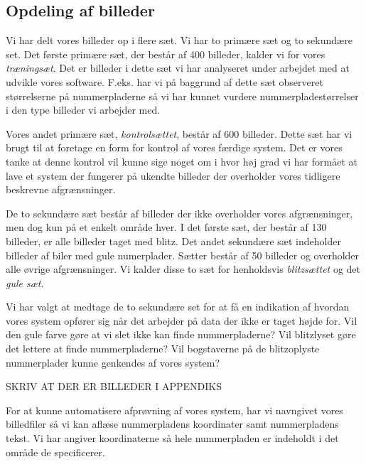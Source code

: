 \subsection{Opdeling af billeder}
Vi har delt vores billeder op i flere sæt. Vi har to primære sæt og to sekundære set. Det første primære sæt, der består af 400 billeder, kalder vi for vores \textit{træningsæt}. Det er billeder i dette sæt vi har analyseret under arbejdet med at udvikle vores software. F.eks. har vi på baggrund af dette sæt observeret størrelserne på nummerpladerne så vi har kunnet vurdere nummerpladestørrelser i den type billeder vi arbejder med.

Vores andet primære sæt, \textit{kontrolsættet}, består af 600 billeder. Dette sæt har vi brugt til at foretage en form for kontrol af vores færdige system. Det er vores tanke at denne kontrol vil kunne sige noget om i hvor høj grad vi har formået at lave et system der fungerer på ukendte billeder der overholder vores tidligere beskrevne afgrænsninger. 

De to sekundære sæt består af billeder der ikke overholder vores afgrænsninger, men dog kun på et enkelt område hver. I det første sæt, der består af 130 billeder, er alle billeder taget med blitz. Det andet sekundære sæt indeholder billeder af biler med gule numerplader. Sætter består af 50 billeder og overholder alle øvrige afgrænsninger. Vi kalder disse to sæt for henholdsvis \textit{blitzsættet} og det \textit{gule sæt}.

Vi har valgt at medtage de to sekundære set for at få en indikation af hvordan vores system opfører sig når det arbejder på data der ikke er taget højde for. Vil den gule farve gøre at vi slet ikke kan finde nummerpladerne? Vil blitzlyset gøre det lettere at finde nummerpladerne? Vil bogstaverne på de blitzoplyste nummerplader kunne genkendes af vores system?

SKRIV AT DER ER BILLEDER I APPENDIKS

For at kunne automatisere afprøvning af vores system, har vi navngivet vores billedfiler så vi kan aflæse nummerpladens koordinater samt nummerpladens tekst. Vi har angiver koordinaterne så hele nummerpladen er indeholdt i det område de specificerer.